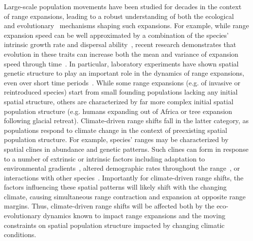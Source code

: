 \documentclass[11pt]{article}
\begin{document}
Large-scale population movements have been studied for decades in the context of range expansions, leading to a robust understanding of both the ecological~\citep{hastings2005spatial} and evolutionary~\citep{shine2011evolutionary, excoffier2009genetic} mechanisms shaping such expansions. For example, while range expansion speed can be well approximated by a combination of the species' intrinsic growth rate and dispersal ability~\citep{fisher1937wave, hastings2005spatial}, recent research demonstrates that evolution in these traits can increase both the mean and variance of expansion speed through time~\citep{szHucs2017rapid, shaw2015dispersal, phillips2015evolutionary}. In particular, laboratory experiments have shown spatial genetic structure to play an important role in the dynamics of range expansions, even over short time periods~\citep{weiss2017rapid,ochocki2017rapid}. While some range expansions (e.g. of invasive or reintroduced species) start from small founding populations lacking any initial spatial structure, others are characterized by far more complex initial spatial population structure (e.g. humans expanding out of Africa or tree expansion following glacial retreat). Climate-driven range shifts fall in the latter category, as populations respond to climate change in the context of preexisting spatial population structure. For example, species' ranges may be characterized by spatial clines in abundance and genetic patterns. Such clines can form in response to a number of extrinsic or intrinsic factors including adaptation to environmental gradients~\citep{kirkpatrick1997evolution}, altered demographic rates throughout the range~\citep{holt2005theoretical}, or interactions with other species~\citep{case2000interspecific}. Importantly for climate-driven range shifts, the factors influencing these spatial patterns will likely shift with the changing climate, causing simultaneous range contraction and expansion at opposite range margins. Thus, climate-driven range shifts will be affected both by the eco-evolutionary dynamics known to impact range expansions and the moving constraints on spatial population structure impacted by changing climatic conditions.
\end{document}
